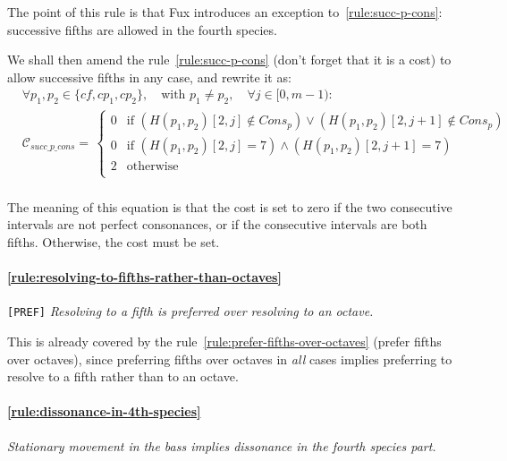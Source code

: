     The point of this rule is that Fux introduces an exception to~\ref{rule:succ-p-cons}: successive fifths are allowed in the fourth species.

    We shall then amend the rule~\ref{rule:succ-p-cons} (don't forget that it is a cost) to allow successive fifths in any case, and rewrite it as:
    \begin{equation} \begin{aligned}
        &\forall p_1, p_2 \in \{\mathit{cf}, cp_1, cp_2\}, \quad \text{with } p_1 \neq p_2, \quad \forall j \in [0, m-1) \colon\\
        &\mathcal{C}_{succ\_p\_cons} = \,  
        \begin{cases}
            0 & \text{if } (H(p_1, p_2)[2, j] \notin Cons_p) \lor (H(p_1, p_2)[2, j+1] \notin Cons_p)\\
            0 & \text{if } (H(p_1, p_2)[2, j] = 7) \land (H(p_1, p_2)[2, j+1] = 7) \\
            2 & \text{otherwise } \\
        \end{cases}\\
    \end{aligned} \end{equation}

    The meaning of this equation is that the cost is set to zero if the two consecutive intervals are not perfect consonances, or if the consecutive intervals are both fifths. Otherwise, the cost must be set.

    \paragraph{\hspace{.6cm}\ref{rule:resolving-to-fifths-rather-than-octaves}} \texttt{[PREF]} \textit{Resolving to a fifth is preferred over resolving to an octave.}    
    
    This is already covered by the rule~\ref{rule:prefer-fifths-over-octaves} (prefer fifths over octaves), since preferring fifths over octaves in \textit{all} cases implies preferring to resolve to a fifth rather than to an octave.

    \paragraph{\hspace{.6cm}\ref{rule:dissonance-in-4th-species}} \textit{Stationary movement in the bass implies dissonance in the fourth species part.}

